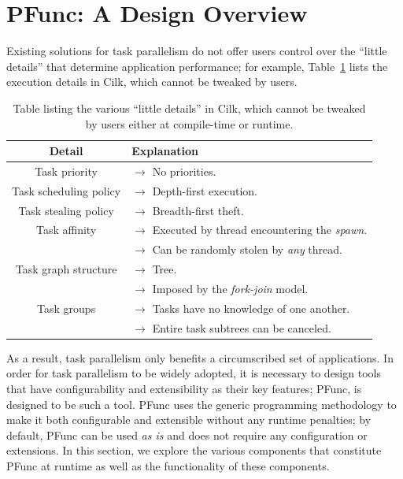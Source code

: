 \section{PFunc: A Design Overview}
\label{sec:design}
 
Existing solutions for task parallelism do not offer users control over the
``little details''  that determine application performance; for example, 
Table~\ref{tbl:cilk_runtime} lists the execution details in Cilk, which 
cannot be tweaked by users.
%
\begin{table}
\centering
\begin{tabular}{|c|l|}
\hline
Detail & Explanation \\
\hline
Task priority & $\rightarrow{}$ No priorities. \\
\hline
Task scheduling policy & $\rightarrow{}$ Depth-first execution. \\
\hline
Task stealing policy & $\rightarrow{}$ Breadth-first theft. \\
\hline
Task affinity & $\rightarrow{}$ Executed by thread encountering the \textit{spawn}. \\
              & $\rightarrow{}$ Can be randomly stolen by \textit{any} thread. \\
\hline
Task graph structure & $\rightarrow{}$ Tree. \\
                     & $\rightarrow{}$ Imposed by the \textit{fork-join} model. \\
\hline
Task groups & $\rightarrow{}$ Tasks have no knowledge of one another. \\
            & $\rightarrow{}$ Entire task subtrees can be canceled. \\
\hline
\end{tabular}
\label{tbl:cilk_runtime}
\caption{Table listing the various ``little details'' in Cilk, which cannot be
tweaked by users either at compile-time or runtime.}
\end{table}
%
As a result, task parallelism only benefits a circumscribed set of
applications.
%
In order for task parallelism to be widely adopted, it is necessary to design
tools that have configurability and extensibility as their key features; 
PFunc, is designed to be such a tool.
%
PFunc uses the generic programming methodology to make it both configurable
and extensible without any runtime penalties; by default, PFunc can be used
\emph{as is} and does not require any configuration or extensions.
%
In this section, we explore the various components that constitute PFunc at
runtime as well as the functionality of these components.

